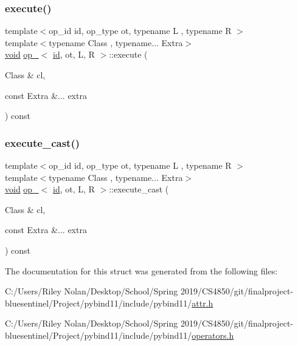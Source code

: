 \subsubsection{\texorpdfstring{execute()}{execute()}}
{\footnotesize\ttfamily template$<$op\+\_\+id id, op\+\_\+type ot, typename L , typename R $>$ \\
template$<$typename Class , typename... Extra$>$ \\
\mbox{\hyperlink{_s_d_l__opengles2__gl2ext_8h_ae5d8fa23ad07c48bb609509eae494c95}{void}} \mbox{\hyperlink{structop__}{op\+\_\+}}$<$ \mbox{\hyperlink{_s_d_l__opengl__glext_8h_a58c2a664503e14ffb8f21012aabff3e9}{id}}, ot, L, R $>$\+::execute (\begin{DoxyParamCaption}\item[{Class \&}]{cl,  }\item[{const Extra \&...}]{extra }\end{DoxyParamCaption}) const\hspace{0.3cm}{\ttfamily [inline]}}

\mbox{\label{structop___a558b286aee467524017f0dac59bb4abf}} 
\subsubsection{\texorpdfstring{execute\_cast()}{execute\_cast()}}
{\footnotesize\ttfamily template$<$op\+\_\+id id, op\+\_\+type ot, typename L , typename R $>$ \\
template$<$typename Class , typename... Extra$>$ \\
\mbox{\hyperlink{_s_d_l__opengles2__gl2ext_8h_ae5d8fa23ad07c48bb609509eae494c95}{void}} \mbox{\hyperlink{structop__}{op\+\_\+}}$<$ \mbox{\hyperlink{_s_d_l__opengl__glext_8h_a58c2a664503e14ffb8f21012aabff3e9}{id}}, ot, L, R $>$\+::execute\+\_\+cast (\begin{DoxyParamCaption}\item[{Class \&}]{cl,  }\item[{const Extra \&...}]{extra }\end{DoxyParamCaption}) const\hspace{0.3cm}{\ttfamily [inline]}}



The documentation for this struct was generated from the following files\+:\begin{DoxyCompactItemize}
\item 
C\+:/\+Users/\+Riley Nolan/\+Desktop/\+School/\+Spring 2019/\+C\+S4850/git/finalproject-\/bluesentinel/\+Project/pybind11/include/pybind11/\mbox{\hyperlink{attr_8h}{attr.\+h}}\item 
C\+:/\+Users/\+Riley Nolan/\+Desktop/\+School/\+Spring 2019/\+C\+S4850/git/finalproject-\/bluesentinel/\+Project/pybind11/include/pybind11/\mbox{\hyperlink{operators_8h}{operators.\+h}}\end{DoxyCompactItemize}

